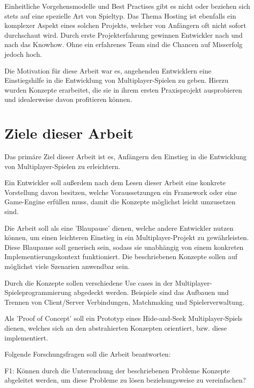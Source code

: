 Einheitliche Vorgehensmodelle und Best Practises gibt es nicht oder beziehen sich stets auf eine spezielle Art von Spieltyp. Das Thema Hosting ist ebenfalls ein komplexer Aspekt eines solchen Projekts, welcher von Anfängern oft nicht sofort durchschaut wird. Durch erste Projekterfahrung gewinnen Entwickler nach und nach das Knowhow. Ohne ein erfahrenes Team sind die Chancen auf Misserfolg jedoch hoch. \cite{Payne.18.09.2019}

Die Motivation für diese Arbeit war es, angehenden Entwicklern eine Einstiegshilfe in die Entwicklung von Multiplayer-Spielen zu geben. Hierzu wurden Konzepte erarbeitet, die sie in ihrem ersten Praxisprojekt ausprobieren und idealerweise davon profitieren können.

\section{Ziele dieser Arbeit}

Das primäre Ziel dieser Arbeit ist es, Anfängern den Einstieg in die Entwicklung von Multiplayer-Spielen zu erleichtern.

Ein Entwickler soll außerdem nach dem Lesen dieser Arbeit eine konkrete Vorstellung davon besitzen, welche Voraussetzungen ein Framework oder eine Game-Engine erfüllen muss, damit die Konzepte möglichst leicht umzusetzen sind.

Die Arbeit soll als eine 'Blaupause' dienen, welche andere Entwickler nutzen können, um einen leichteren Einstieg in ein Multiplayer-Projekt zu gewährleisten. Diese Blaupause soll generisch sein, sodass sie unabhängig von einem konkreten Implementierungskontext funktioniert. Die beschriebenen Konzepte sollen auf möglichst viele Szenarien anwendbar sein.

Durch die Konzepte sollen verschiedene Use cases in der Multiplayer-Spieleprogrammierung abgedeckt werden. Beispiele sind das Aufbauen und Trennen von Client/Server Verbindungen, Matchmaking \cite{Wikipedia.2021b} und Spielerverwaltung.

Als 'Proof of Concept' soll ein Prototyp eines Hide-and-Seek Multiplayer-Spiels dienen, welches sich an den abstrahierten Konzepten orientiert, bzw. diese implementiert.

Folgende Forschungsfragen soll die Arbeit beantworten:

\label{f1} \textsf{\Large F1:} Können durch die Untersuchung der beschriebenen Probleme Konzepte abgeleitet werden, um diese Probleme zu lösen beziehungsweise zu vereinfachen?

